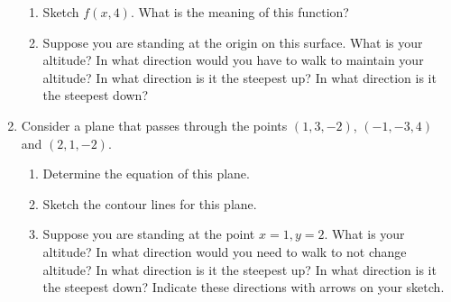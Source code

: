 \documentclass[12pt]{article}
\begin{document}
\begin{enumerate}
\begin{enumerate}
\item Sketch $f(x,4)$.  What is the meaning of this function?

\item Suppose you are standing at the origin on this surface.  What is
  your altitude?  In what direction would you have to walk to maintain
  your altitude?  In what direction is it the steepest up?  In what
  direction is it the steepest down?
\end{enumerate}


\item Consider a plane that passes through the points $(1,3,-2)$,
  $(-1,-3,4)$ and $(2,1,-2)$. 
\begin{enumerate}
  \item Determine the equation of this plane.
\item Sketch the contour lines for this plane.

\item Suppose you are standing at the point $x=1,y=2$.  What is your
  altitude?  In what direction would you need to walk to not change
  altitude?  In what direction is it the steepest up?  In what
  direction is it the steepest down?  Indicate these directions with
  arrows on your sketch.


\end{enumerate}
\end{enumerate}
\end{document}
